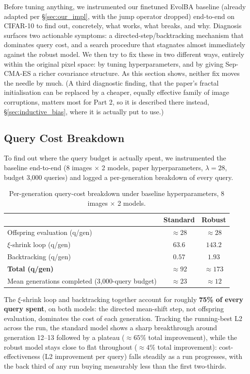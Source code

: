 \documentclass[11pt, a4paper]{article}
\begin{document}
Before tuning anything, we instrumented our finetuned EvolBA baseline (already adapted per \S\ref{sec:our_impl}, with the jump operator dropped) end-to-end on CIFAR-10 to find out, concretely, what works, what breaks, and why. Diagnosis surfaces two actionable symptoms: a directed-step/backtracking mechanism that dominates query cost, and a search procedure that stagnates almost immediately against the robust model. We then try to fix these in two different ways, entirely within the original pixel space: by tuning hyperparameters, and by giving Sep-CMA-ES a richer covariance structure. As this section shows, neither fix moves the needle by much. (A third diagnostic finding, that the paper's fractal initialisation can be replaced by a cheaper, equally effective family of image corruptions, matters most for Part 2, so it is described there instead, \S\ref{sec:inductive_bias}, where it is actually put to use.)

\subsection{Query Cost Breakdown}

To find out where the query budget is actually spent, we instrumented the baseline end-to-end (8 images $\times$ 2 models, paper hyperparameters, $\lambda=28$, budget 3{,}000 queries) and logged a per-generation breakdown of every query.

\begin{table}[htbp]
\centering
\caption{Per-generation query-cost breakdown under baseline hyperparameters, 8 images $\times$ 2 models.}
\label{tab:diag_query}
\begin{tabular}{lcc}
\toprule
 & Standard & Robust \\
\midrule
Offspring evaluation (q/gen) & $\approx28$ & $\approx28$ \\
$\xi$-shrink loop (q/gen)    & $\mathbf{63.6}$ & $\mathbf{143.2}$ \\
Backtracking (q/gen)         & $0.57$ & $1.93$ \\
\textbf{Total (q/gen)}       & $\approx92$ & $\approx173$ \\
Mean generations completed (3{,}000-query budget) & $\approx23$ & $\approx12$ \\
\bottomrule
\end{tabular}
\end{table}

The $\xi$-shrink loop and backtracking together account for roughly \textbf{75\% of every query spent}, on both models: the directed mean-shift step, not offspring evaluation, dominates the cost of each generation. Tracking the running-best L2 across the run, the standard model shows a sharp breakthrough around generation 12--13 followed by a plateau ($\approx65\%$ total improvement), while the robust model stays close to flat throughout ($\approx4\%$ total improvement): cost-effectiveness (L2 improvement per query) falls steadily as a run progresses, with the back third of any run buying measurably less than the first two-thirds.
\end{document}
